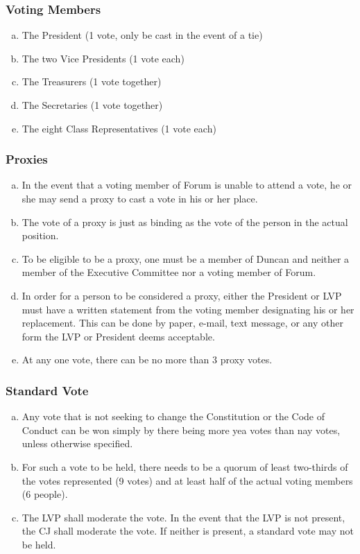 \documentclass[USletter,12pt]{article}
\begin{document}
\subsubsection{Voting Members}
\begin{enumerate}[(a)]
\item The President (1 vote, only be cast in the event of a tie)
\item The two Vice Presidents (1 vote each)
\item The Treasurers (1 vote together)
\item The Secretaries (1 vote together)
\item The eight Class Representatives (1 vote each)
\end{enumerate}

\subsubsection{Proxies}
\begin{enumerate}[(a)]
\item In the event that a voting member of Forum is unable to attend a vote, he or she may send a proxy to cast a vote in his or her place.
\item The vote of a proxy is just as binding as the vote of the person in the actual position.
\item To be eligible to be a proxy, one must be a member of Duncan and neither a member of the Executive Committee nor a voting member of Forum.
\item In order for a person to be considered a proxy, either the President or LVP must have a written statement from the voting member designating his or her replacement.  This can be done by paper, e-mail, text message, or any other form the LVP or President deems acceptable.
\item At any one vote, there can be no more than 3 proxy votes.
\end{enumerate}

\subsubsection{Standard Vote}
\begin{enumerate}[(a)]
\item Any vote that is not seeking to change the Constitution or the Code of Conduct can be won simply by there being more yea votes than nay votes, unless otherwise specified.
\item For such a vote to be held, there needs to be a quorum of least two-thirds of the votes represented (9 votes) and at least half of the actual voting members (6 people).
\item The LVP shall moderate the vote.  In the event that the LVP is not present, the CJ shall moderate the vote.  If neither is present, a standard vote may not be held.
\end{enumerate}
\end{document}
